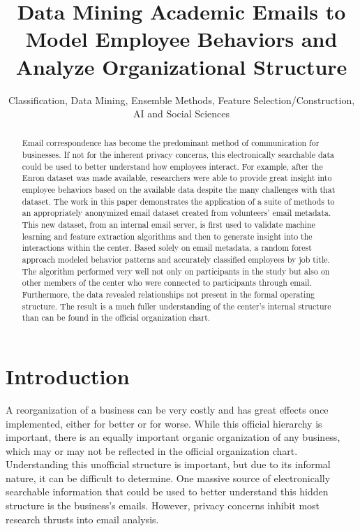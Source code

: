 \documentclass{article}
\begin{document}
\title{Data Mining Academic Emails to Model Employee Behaviors and Analyze Organizational Structure}
\author{Classification, Data Mining, Ensemble Methods, Feature Selection/Construction, AI and Social Sciences}
\maketitle

\begin{abstract}
Email correspondence has become the predominant method of communication for businesses.  If not for the inherent privacy concerns, this electronically searchable data could be used to better understand how employees interact. For example, after the Enron dataset was made available, researchers were able to provide great insight into employee behaviors based on the available data despite the many challenges with that dataset.  The work in this paper demonstrates the application of a suite of methods to an appropriately anonymized email dataset created from volunteers' email metadata.  This new dataset, from an internal email server, is first used to validate machine learning and feature extraction algorithms and then to generate insight into the interactions within the center.  Based solely on email metadata, a random forest approach modeled behavior patterns and accurately classified employees by job title.  The algorithm performed very well not only on participants in the study but also on other members of the center who were connected to participants through email.  Furthermore, the data revealed relationships not present in the formal operating structure.  The result is a much fuller understanding of the center's internal structure than can be found in the official organization chart.
\end{abstract}

\section{Introduction}
A reorganization of a business can be very costly and has great effects once implemented, either for better or for worse.  While this official hierarchy is important, there is an equally important organic organization of any business, which may or may not be reflected in the official organization chart.  Understanding this unofficial structure is important, but due to its informal nature, it can be difficult to determine.  One massive source of electronically searchable information that could be used to better understand this hidden structure is the business's emails.  However, privacy concerns inhibit most research thrusts into email analysis.  
\end{document}
